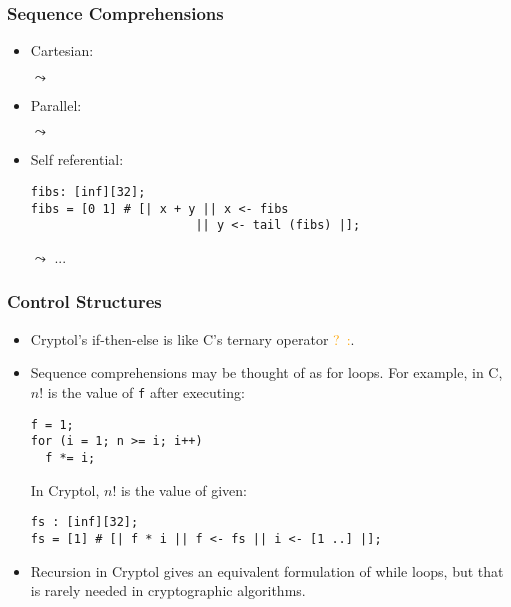 \documentclass{beamer}
\newcommand{\x}[1]{\framebox{\frenchspacing\strut\texttt{#1}}}
\begin{document}
\begin{frame}[fragile]

  \frametitle{Sequence Comprehensions}
   
  \begin{itemize}
    \item<+-> Cartesian: \begin{center}\x{[| x \^{} y || x <- [0 .. 1],   y <- [1 .. 3] |]} $\leadsto$ \x{[1 2 3 0 3 2]}\end{center}
    \item<+-> Parallel:  \begin{center}\x{[| x \^{} y || x <- [0 .. 1] || y <- [1 .. 3] |]} $\leadsto$ \x{[1 3]}\end{center}
    \item<+-> Self referential:  \begin{Verbatim}[frame=single]
fibs: [inf][32];
fibs = [0 1] # [| x + y || x <- fibs 
                       || y <- tail (fibs) |];
      \end{Verbatim}
      \begin{center}
        \x{fibs} $\leadsto$ \pause \x{[0 1 1 2 3 5 8} ...
      \end{center}
  \end{itemize}


\end{frame}




\begin{frame}[fragile]

  \frametitle{Control Structures}
   
  \begin{itemize}
    \item Cryptol's if-then-else is like C's ternary operator \textcolor{orange}{?\ :}. \pause
    \item Sequence comprehensions may be thought of as for loops. For example, in C, $n!$ is the value of \texttt{f} after executing:
      \begin{Verbatim}[frame=single]
f = 1;
for (i = 1; n >= i; i++)
  f *= i;
      \end{Verbatim}
      \pause In Cryptol, $n!$ is the value of \x{fs @ n} given:
      \begin{Verbatim}[frame=single]
fs : [inf][32];
fs = [1] # [| f * i || f <- fs || i <- [1 ..] |];
      \end{Verbatim}
    \item \pause Recursion in Cryptol gives an equivalent formulation of while loops, but that is rarely needed in cryptographic algorithms.
  \end{itemize}


\end{frame}
\end{document}
